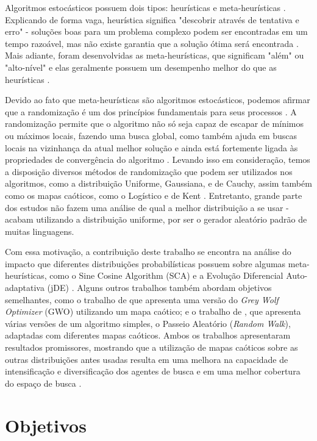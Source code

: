 \documentclass[11pt]{article}
\begin{document}
Algoritmos estocásticos possuem dois tipos: heurísticas e meta-heurísticas \cite{yang}. Explicando de forma vaga, heurística significa "descobrir através de tentativa e erro" - soluções boas para um problema complexo podem ser encontradas em um tempo razoável, mas não existe garantia que a solução ótima será encontrada \cite{yang}. Mais adiante, foram desenvolvidas as meta-heurísticas, que significam "além" ou "alto-nível" e elas geralmente possuem um desempenho melhor do que as heurísticas \cite{yang}.

Devido ao fato que meta-heurísticas são algoritmos estocásticos, podemos afirmar que a randomização é um dos princípios fundamentais para seus processos \cite{yang2}. A randomização permite que o algoritmo não só seja capaz de escapar de mínimos ou máximos locais, fazendo uma busca global, como também ajuda em buscas locais na vizinhança da atual melhor solução \cite{yang2} e ainda está fortemente ligada às propriedades de convergência do algoritmo \cite{caponetto}. Levando isso em consideração, temos a disposição diversos métodos de randomização que podem ser utilizados nos algoritmos, como a distribuição Uniforme, Gaussiana, e de Cauchy, assim também como os mapas caóticos, como o Logístico e de Kent \cite{fister}. Entretanto, grande parte dos estudos não fazem uma análise de qual a melhor distribuição a se usar - acabam utilizando a distribuição uniforme, por ser o gerador aleatório padrão de muitas linguagens.

Com essa motivação, a contribuição deste trabalho se encontra na análise do impacto que diferentes distribuições probabilísticas possuem sobre algumas meta-heurísticas, como o Sine Cosine Algorithm (SCA) \cite{mirjalili} e a Evolução Diferencial Auto-adaptativa (jDE) \cite{brest}. Alguns outros trabalhos também abordam objetivos semelhantes, como o trabalho de \cite{saxena} que apresenta uma versão do \textit{Grey Wolf Optimizer} (GWO) utilizando um mapa caótico; e o trabalho de \cite{jana}, que apresenta várias versões de um algoritmo simples, o Passeio Aleatório (\textit{Random Walk}), adaptadas com diferentes mapas caóticos. Ambos os trabalhos apresentaram resultados promissores, mostrando que a utilização de mapas caóticos sobre as outras distribuições antes usadas resulta em uma melhora na capacidade de intensificação e diversificação dos agentes de busca \cite{saxena} e em uma melhor cobertura do espaço de busca \cite{jana}. 

\section{Objetivos}
\label{obj}
\end{document}
